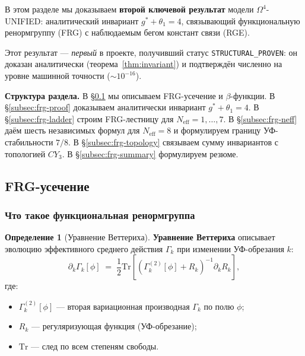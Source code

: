 \documentclass[11pt,a4paper]{article}
\newcommand{\CY}{\ensuremath{CY_3}}
\newcommand{\Om}{\ensuremath{\Omega^4}}
\theoremstyle{definition}
\newtheorem{definition}[theorem]{Определение}
\begin{document}
В этом разделе мы доказываем \textbf{второй ключевой результат}
модели $\Om$-UNIFIED: аналитический инвариант $g^* + \theta_1 = 4$,
связывающий функциональную ренормгруппу (FRG) с наблюдаемым
бегом констант связи (RGE).

Этот результат --- \emph{первый} в проекте, получивший статус
\texttt{STRUCTURAL\_PROVEN}: он доказан аналитически
(теорема~\ref{thm:invariant}) и подтверждён численно
на уровне машинной точности ($\sim 10^{-16}$).

\medskip\noindent
\textbf{Структура раздела.}
В \S\ref{subsec:frg-setup} мы описываем FRG-усечение и
$\beta$-функции.
В \S\ref{subsec:frg-proof} доказываем аналитически инвариант
$g^* + \theta_1 = 4$.
В \S\ref{subsec:frg-ladder} строим FRG-лестницу для
$N_{\text{eff}} = 1, \ldots, 7$.
В \S\ref{subsec:frg-neff} даём шесть независимых формул
для $N_{\text{eff}} = 8$ и формулируем границу
УФ-стабильности $7/8$.
В \S\ref{subsec:frg-topology} связываем сумму инвариантов
с топологией $\CY$.
В \S\ref{subsec:frg-summary} формулируем резюме.

\subsection{FRG-усечение}
\label{subsec:frg-setup}

\subsubsection{Что такое функциональная ренормгруппа}

\begin{definition}[Уравнение Веттериха]
\label{def:wetterich}
\textbf{Уравнение Веттериха} описывает эволюцию эффективного
среднего действия $\Gamma_k$ при изменении УФ-обрезания $k$:
\begin{equation}
    \partial_k \Gamma_k[\phi]
    \;=\; \frac{1}{2} \mathrm{Tr}\left[
    \left(\Gamma_k^{(2)}[\phi] + R_k\right)^{-1} \partial_k R_k
    \right],
    \label{eq:wetterich}
\end{equation}
где:
\begin{itemize}
    \item $\Gamma_k^{(2)}[\phi]$ --- вторая вариационная производная
          $\Gamma_k$ по полю $\phi$;
    \item $R_k$ --- регуляризующая функция (УФ-обрезание);
    \item $\mathrm{Tr}$ --- след по всем степеням свободы.
\end{itemize}
\end{definition}
\end{document}
